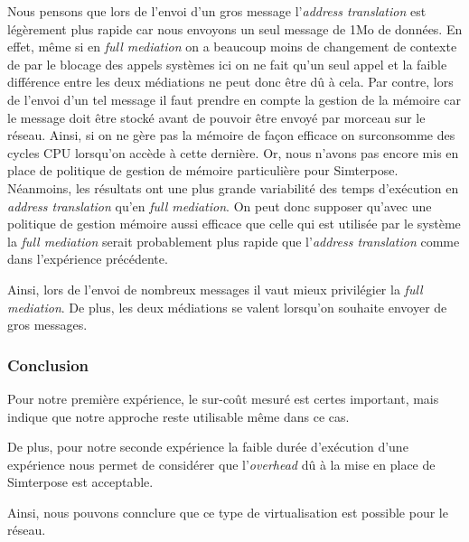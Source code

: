 Nous pensons que lors de l'envoi d'un gros message l'\textit{address translation} est légèrement plus rapide car nous envoyons un seul message de 1Mo de données. En effet, même si en \textit{full mediation} on a beaucoup moins de changement de contexte de par le blocage des appels systèmes ici on ne fait qu'un seul appel et la faible différence entre les deux médiations ne peut donc être dû à cela. Par contre, lors de l'envoi d'un tel message il faut prendre en compte la gestion de la mémoire car le message doit être stocké avant de pouvoir être envoyé par morceau sur le réseau. Ainsi, si on ne gère pas la mémoire de façon efficace on surconsomme des cycles CPU lorsqu'on accède à cette dernière. Or, nous n'avons pas encore mis en place de politique de gestion de mémoire particulière pour Simterpose. Néanmoins, les résultats ont une plus grande variabilité des temps d'exécution en \textit{address translation} qu'en \textit{full mediation}. On peut donc supposer qu'avec une politique de gestion mémoire aussi efficace que celle qui est utilisée par le système la \textit{full mediation} serait probablement plus rapide que l'\textit{address translation} comme dans l'expérience précédente.

 Ainsi, lors de l'envoi de nombreux messages il vaut mieux privilégier la \textit{full mediation}. De plus, les deux médiations se valent lorsqu'on souhaite envoyer de gros messages.
\subsubsection{Conclusion}

Pour notre première expérience, le sur-coût mesuré est certes important, mais indique que notre approche reste utilisable même dans ce cas.

De plus, pour notre seconde expérience la faible durée d'exécution d'une expérience nous permet de considérer que l'\textit{overhead} dû à la mise en place de Simterpose est acceptable.

Ainsi, nous pouvons connclure que ce type de virtualisation est possible pour le réseau.
